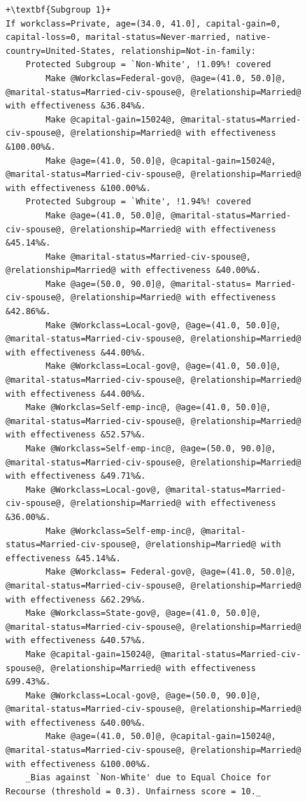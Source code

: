 \documentclass{article}
\begin{document}
\begin{figure}[ht]
\centering
\begin{minipage}{1\linewidth}
\begin{lstlisting}[style = base,escapechar=+]
+\textbf{Subgroup 1}+
If workclass=Private, age=(34.0, 41.0], capital-gain=0, capital-loss=0, marital-status=Never-married, native-country=United-States, relationship=Not-in-family:
    Protected Subgroup = `Non-White', !1.09%! covered
        Make @Workclas=Federal-gov@, @age=(41.0, 50.0]@, @marital-status=Married-civ-spouse@, @relationship=Married@ with effectiveness &36.84%&.
        Make @capital-gain=15024@, @marital-status=Married-civ-spouse@, @relationship=Married@ with effectiveness &100.00%&.
        Make @age=(41.0, 50.0]@, @capital-gain=15024@, @marital-status=Married-civ-spouse@, @relationship=Married@ with effectiveness &100.00%&.
    Protected Subgroup = `White', !1.94%! covered
        Make @age=(41.0, 50.0]@, @marital-status=Married-civ-spouse@, @relationship=Married@ with effectiveness &45.14%&.
        Make @marital-status=Married-civ-spouse@, @relationship=Married@ with effectiveness &40.00%&.
        Make @age=(50.0, 90.0]@, @marital-status= Married-civ-spouse@, @relationship=Married@ with effectiveness &42.86%&.
        Make @Workclass=Local-gov@, @age=(41.0, 50.0]@, @marital-status=Married-civ-spouse@, @relationship=Married@ with effectiveness &44.00%&.
        Make @Workclass=Local-gov@, @age=(41.0, 50.0]@, @marital-status=Married-civ-spouse@, @relationship=Married@ with effectiveness &44.00%&.
	Make @Workclas=Self-emp-inc@, @age=(41.0, 50.0]@, @marital-status=Married-civ-spouse@, @relationship=Married@ with effectiveness &52.57%&.
	Make @Workclass=Self-emp-inc@, @age=(50.0, 90.0]@, @marital-status=Married-civ-spouse@, @relationship=Married@ with effectiveness &49.71%&.
	Make @Workclass=Local-gov@, @marital-status=Married-civ-spouse@, @relationship=Married@ with effectiveness &36.00%&.
        Make @Workclass=Self-emp-inc@, @marital-status=Married-civ-spouse@, @relationship=Married@ with effectiveness &45.14%&.
        Make @Workclass= Federal-gov@, @age=(41.0, 50.0]@, @marital-status=Married-civ-spouse@, @relationship=Married@ with effectiveness &62.29%&.
	Make @Workclass=State-gov@, @age=(41.0, 50.0]@, @marital-status=Married-civ-spouse@, @relationship=Married@ with effectiveness &40.57%&.
	Make @capital-gain=15024@, @marital-status=Married-civ-spouse@, @relationship=Married@ with effectiveness &99.43%&.
	Make @Workclass=Local-gov@, @age=(50.0, 90.0]@, @marital-status=Married-civ-spouse@, @relationship=Married@ with effectiveness &40.00%&.
        Make @age=(41.0, 50.0]@, @capital-gain=15024@, @marital-status=Married-civ-spouse@, @relationship=Married@ with effectiveness &100.00%&.
    _Bias against `Non-White' due to Equal Choice for Recourse (threshold = 0.3). Unfairness score = 10._
\end{lstlisting}


\end{minipage}
\end{figure}
\end{document}

